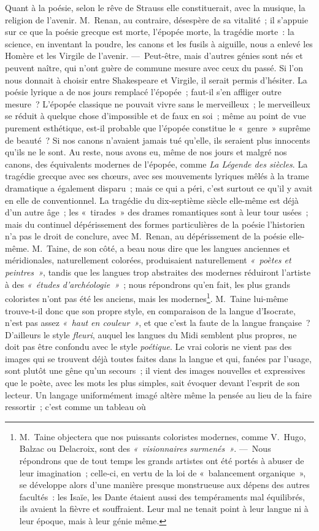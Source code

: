 \documentclass[french,twoside]{book} %
\begin{document}
Quant à la poésie, selon le rêve de Strauss elle constituerait, avec la musique, la religion de l’avenir. M. Renan, au contraire, désespère de sa vitalité ; il s’appuie sur ce que la poésie grecque est morte, l’épopée morte, la tragédie morte : la science, en inventant la poudre, les canons et les fusils à aiguille, nous a enlevé les Homère et les Virgile de l’avenir. — Peut-être, mais d’autres génies sont nés et peuvent naître, qui n’ont guère de commune mesure avec ceux du passé. Si l’on nous donnait à choisir entre Shakespeare et Virgile, il serait permis d’hésiter. La poésie lyrique a de nos jours remplacé l’épopée ; faut-il s’en affliger outre mesure ? L’épopée classique ne pouvait vivre sans le merveilleux ; le merveilleux se réduit à quelque chose d’impossible et de faux en soi ; même au point de vue purement esthétique, est-il probable que l’épopée constitue le « genre » suprême de beauté ? Si nos canons n’avaient jamais tué qu’elle, ils seraient plus innocents qu’ils ne le sont. Au reste, nous avons eu, même de nos jours et malgré nos canons, des équivalents modernes de l’épopée, comme \emph{La Légende des siècles}. La tragédie grecque avec ses  chœurs, avec ses mouvements lyriques mêlés à la trame dramatique a également disparu ; mais ce qui a péri, c’est surtout ce qu’il y avait en elle de conventionnel. La tragédie du dix-septième siècle elle-même est déjà d’un autre âge ; les « tirades » des drames romantiques sont à leur tour usées ; mais du continuel dépérissement des formes particulières de la poésie l’historien n’a pas le droit de conclure, avec M. Renan, au dépérissement de la poésie elle-même. M. Taine, de son côté, a beau nous dire que les langues anciennes et méridionales, naturellement colorées, produisaient naturellement \emph{« poètes et peintres »}, tandis que les langues trop abstraites des modernes réduiront l’artiste à des \emph{« études d’archéologie »} ; nous répondrons qu’en fait, les plus grands coloristes n’ont pas été les anciens, mais les modernes\footnote{M. Taine objectera que nos puissants coloristes modernes, comme V. Hugo, Balzac ou Delacroix, sont des \emph{« visionnaires surmenés »}. — Nous répondrons que de tout temps les grands artistes ont été portés à abuser de leur imagination ; celle-ci, en vertu de la loi de « balancement organique », se développe alors d’une manière presque monstrueuse aux dépens des autres facultés : les Isaïe, les Dante étaient aussi des tempéraments mal équilibrés, ils avaient la fièvre et souffraient. Leur mal ne tenait point à leur langue ni à leur époque, mais à leur génie même.}. M. Taine lui-même trouve-t-il donc que son propre style, en comparaison de la langue d’Isocrate, n’est pas assez \emph{« haut en couleur »}, et que c’est la faute de la langue française ? D’ailleurs le style \emph{fleuri}, auquel les langues du Midi semblent plus propres, ne doit pas être confondu avec le style \emph{poétique}. Le vrai coloris ne vient pas des images qui se trouvent déjà toutes faites dans la langue et qui, fanées par l’usage, sont  plutôt une gêne qu’un secours ; il vient des images nouvelles et expressives que le poète, avec les mots les plus simples, sait évoquer devant l’esprit de son lecteur. Un langage uniformément imagé altère même la pensée au lieu de la faire ressortir ; c’est comme un tableau où 
\end{document}
